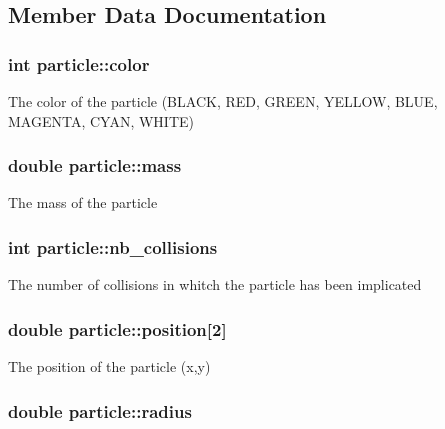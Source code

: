 \subsection{Member Data Documentation}
\hypertarget{structparticle_ae69e1b87d7b05a3f4441ebf855fd63e2}{
\subsubsection[{color}]{\setlength{\rightskip}{0pt plus 5cm}int particle\-::color}}\label{structparticle_ae69e1b87d7b05a3f4441ebf855fd63e2}
The color of the particle (B\-L\-A\-C\-K, R\-E\-D, G\-R\-E\-E\-N, Y\-E\-L\-L\-O\-W, B\-L\-U\-E, M\-A\-G\-E\-N\-T\-A, C\-Y\-A\-N, W\-H\-I\-T\-E) \hypertarget{structparticle_a37f838ffbedd34713ac24784a7f33a80}{
\subsubsection[{mass}]{\setlength{\rightskip}{0pt plus 5cm}double particle\-::mass}}\label{structparticle_a37f838ffbedd34713ac24784a7f33a80}
The mass of the particle \hypertarget{structparticle_aad4464e45831e45c9674a436d008a4a8}{
\subsubsection[{nb\-\_\-collisions}]{\setlength{\rightskip}{0pt plus 5cm}int particle\-::nb\-\_\-collisions}}\label{structparticle_aad4464e45831e45c9674a436d008a4a8}
The number of collisions in whitch the particle has been implicated \hypertarget{structparticle_a38d2e3b9410ef872a9428370336ab743}{
\subsubsection[{position}]{\setlength{\rightskip}{0pt plus 5cm}double particle\-::position\mbox{[}2\mbox{]}}}\label{structparticle_a38d2e3b9410ef872a9428370336ab743}
The position of the particle (x,y) \hypertarget{structparticle_a9f269f871b1e0da6aadc52ea459e90fa}{
\subsubsection[{radius}]{\setlength{\rightskip}{0pt plus 5cm}double particle\-::radius}}\label{structparticle_a9f269f871b1e0da6aadc52ea459e90fa}
